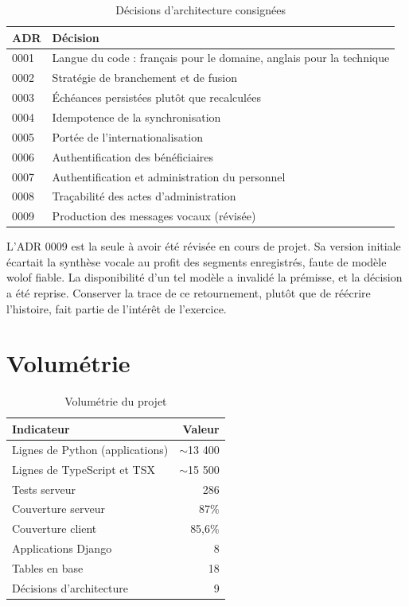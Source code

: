 \documentclass[11pt,a4paper]{report}
\begin{document}
\begin{table}[H]
\centering
\small
\begin{tabularx}{\textwidth}{@{}lX@{}}
\toprule
\textbf{ADR} & \textbf{Décision} \\
\midrule
0001 & Langue du code : français pour le domaine, anglais pour la technique \\
0002 & Stratégie de branchement et de fusion \\
0003 & Échéances persistées plutôt que recalculées \\
0004 & Idempotence de la synchronisation \\
0005 & Portée de l'internationalisation \\
0006 & Authentification des bénéficiaires \\
0007 & Authentification et administration du personnel \\
0008 & Traçabilité des actes d'administration \\
0009 & Production des messages vocaux (révisée) \\
\bottomrule
\end{tabularx}
\caption{Décisions d'architecture consignées}
\end{table}

L'ADR 0009 est la seule à avoir été révisée en cours de projet. Sa version
initiale écartait la synthèse vocale au profit des segments enregistrés,
faute de modèle wolof fiable. La disponibilité d'un tel modèle a invalidé la
prémisse, et la décision a été reprise. Conserver la trace de ce
retournement, plutôt que de réécrire l'histoire, fait partie de l'intérêt de
l'exercice.

\section{Volumétrie}

\begin{table}[H]
\centering
\begin{tabular}{@{}lr@{}}
\toprule
\textbf{Indicateur} & \textbf{Valeur} \\
\midrule
Lignes de Python (applications) & $\sim$13 400 \\
Lignes de TypeScript et TSX & $\sim$15 500 \\
Tests serveur & 286 \\
Couverture serveur & 87\% \\
Couverture client & 85,6\% \\
Applications Django & 8 \\
Tables en base & 18 \\
Décisions d'architecture & 9 \\
\bottomrule
\end{tabular}
\caption{Volumétrie du projet}
\end{table}
\end{document}
